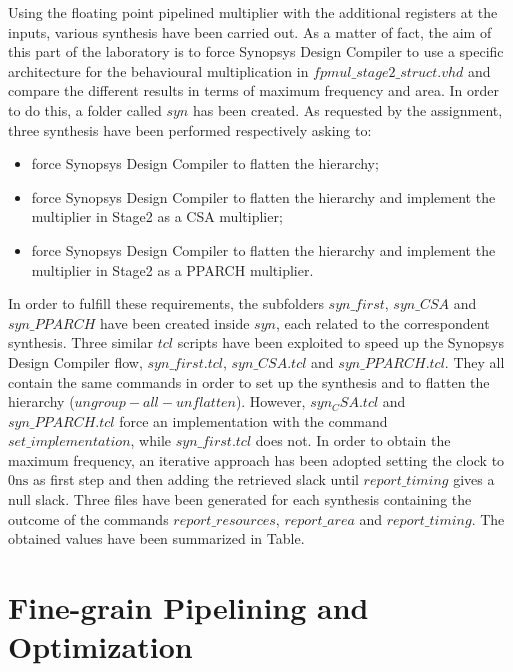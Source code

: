 Using the floating point pipelined multiplier with the additional registers at the inputs, various synthesis have been carried out. As a matter of fact, the aim of this part of the laboratory is to force Synopsys Design Compiler to use a specific architecture for the behavioural multiplication in $fpmul\_stage2\_struct.vhd$ and compare the different results in terms of maximum frequency and area.
In order to do this, a folder called $syn$ has been created. As requested by the assignment, three synthesis have been performed respectively asking to:

\begin{itemize}
\item force Synopsys Design Compiler to flatten the hierarchy;
\item force Synopsys Design Compiler to flatten the hierarchy and implement the multiplier in Stage2 as a CSA multiplier;
\item force Synopsys Design Compiler to flatten the hierarchy and implement the multiplier in Stage2 as a PPARCH multiplier.
\end{itemize}

\noindent In order to fulfill these requirements, the subfolders $syn\_first$, $syn\_CSA$ and $syn\_PPARCH$ have been created inside $syn$, each related to the correspondent synthesis. Three similar $tcl$ scripts have been exploited to speed up the Synopsys Design Compiler flow, $syn\_first.tcl$, $syn\_CSA.tcl$ and $syn\_PPARCH.tcl$. They all contain the same commands in order to set up the synthesis and to flatten the hierarchy ($ungroup  -all -unflatten$). However, $syn_CSA.tcl$ and $syn\_PPARCH.tcl$ force an implementation with the command $set\_implementation$, while $syn\_first.tcl$ does not.
In order to obtain the maximum frequency, an iterative approach has been adopted setting the clock to $0\si{\nano\second}$ as first step and then adding the retrieved slack until $report\_timing$ gives a null slack. Three files have been generated for each synthesis containing the outcome of the commands $report\_resources$, $report\_area$ and $report\_timing$. The obtained values have been summarized in Table.


\section{Fine-grain Pipelining and Optimization}

